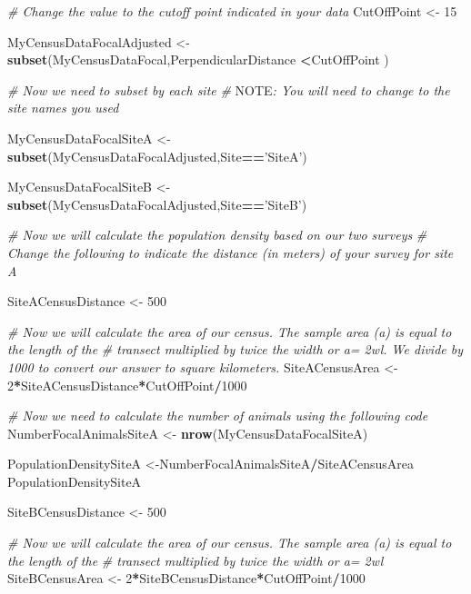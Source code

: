 \documentclass[]{book}
\newenvironment{Shaded}{\begin{snugshade}}{\end{snugshade}}
\newcommand{\AlertTok}[1]{\textcolor[rgb]{0.94,0.16,0.16}{#1}}
\newcommand{\CommentTok}[1]{\textcolor[rgb]{0.56,0.35,0.01}{\textit{#1}}}
\newcommand{\DecValTok}[1]{\textcolor[rgb]{0.00,0.00,0.81}{#1}}
\newcommand{\KeywordTok}[1]{\textcolor[rgb]{0.13,0.29,0.53}{\textbf{#1}}}
\newcommand{\NormalTok}[1]{#1}
\newcommand{\OperatorTok}[1]{\textcolor[rgb]{0.81,0.36,0.00}{\textbf{#1}}}
\newcommand{\StringTok}[1]{\textcolor[rgb]{0.31,0.60,0.02}{#1}}
\begin{document}
\begin{Shaded}
\begin{Highlighting}[]
\CommentTok{# Change the value to the cutoff point indicated in your data}
\NormalTok{CutOffPoint <-}\StringTok{ }\DecValTok{15}

\NormalTok{MyCensusDataFocalAdjusted <-}\StringTok{ }\KeywordTok{subset}\NormalTok{(MyCensusDataFocal,PerpendicularDistance }\OperatorTok{<}\NormalTok{CutOffPoint )}

\CommentTok{# Now we need to subset by each site}
\CommentTok{# }\AlertTok{NOTE}\CommentTok{: You will need to change to the site names you used}

\NormalTok{MyCensusDataFocalSiteA <-}\StringTok{ }\KeywordTok{subset}\NormalTok{(MyCensusDataFocalAdjusted,Site}\OperatorTok{==}\StringTok{'SiteA'}\NormalTok{)}

\NormalTok{MyCensusDataFocalSiteB <-}\StringTok{ }\KeywordTok{subset}\NormalTok{(MyCensusDataFocalAdjusted,Site}\OperatorTok{==}\StringTok{'SiteB'}\NormalTok{)}

\CommentTok{# Now we will calculate the population density based on our two surveys}
\CommentTok{# Change the following to indicate the distance (in meters) of your survey for site A}

\NormalTok{SiteACensusDistance <-}\StringTok{ }\DecValTok{500}

\CommentTok{# Now we will calculate the area of our census. The sample area (a) is equal to the length of the}
\CommentTok{# transect multiplied by twice the width or a= 2wl. We divide by 1000 to convert our answer to square kilometers.}
\NormalTok{SiteACensusArea <-}\StringTok{ }\DecValTok{2}\OperatorTok{*}\NormalTok{SiteACensusDistance}\OperatorTok{*}\NormalTok{CutOffPoint}\OperatorTok{/}\DecValTok{1000}

\CommentTok{# Now we need to calculate the number of animals using the following code}
\NormalTok{NumberFocalAnimalsSiteA <-}\StringTok{ }\KeywordTok{nrow}\NormalTok{(MyCensusDataFocalSiteA)}

\NormalTok{PopulationDensitySiteA <-NumberFocalAnimalsSiteA}\OperatorTok{/}\NormalTok{SiteACensusArea}
\NormalTok{PopulationDensitySiteA}


\NormalTok{SiteBCensusDistance <-}\StringTok{ }\DecValTok{500}

\CommentTok{# Now we will calculate the area of our census. The sample area (a) is equal to the length of the}
\CommentTok{# transect multiplied by twice the width or a= 2wl}
\NormalTok{SiteBCensusArea <-}\StringTok{ }\DecValTok{2}\OperatorTok{*}\NormalTok{SiteBCensusDistance}\OperatorTok{*}\NormalTok{CutOffPoint}\OperatorTok{/}\DecValTok{1000}


\end{Highlighting}
\end{Shaded}
\end{document}
